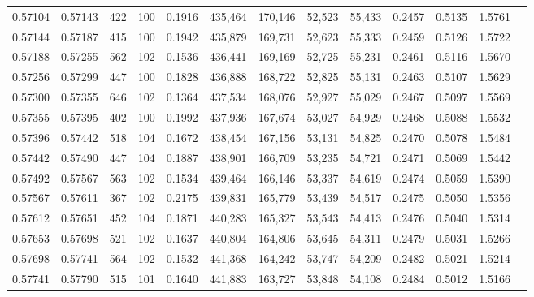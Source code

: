 \begin{tabular}{rrrrrrrrrrrrr}
0.57104 & 0.57143 &   422 & 100 &                                     0.1916 & 435,464 & 170,146 &  52,523 &  55,433 & 0.2457 & 0.5135 & 1.5761 \\
0.57144 & 0.57187 &   415 & 100 &                                     0.1942 & 435,879 & 169,731 &  52,623 &  55,333 & 0.2459 & 0.5126 & 1.5722 \\
0.57188 & 0.57255 &   562 & 102 &                                     0.1536 & 436,441 & 169,169 &  52,725 &  55,231 & 0.2461 & 0.5116 & 1.5670 \\
0.57256 & 0.57299 &   447 & 100 &                                     0.1828 & 436,888 & 168,722 &  52,825 &  55,131 & 0.2463 & 0.5107 & 1.5629 \\
0.57300 & 0.57355 &   646 & 102 &                                     0.1364 & 437,534 & 168,076 &  52,927 &  55,029 & 0.2467 & 0.5097 & 1.5569 \\
0.57355 & 0.57395 &   402 & 100 &                                     0.1992 & 437,936 & 167,674 &  53,027 &  54,929 & 0.2468 & 0.5088 & 1.5532 \\
0.57396 & 0.57442 &   518 & 104 &                                     0.1672 & 438,454 & 167,156 &  53,131 &  54,825 & 0.2470 & 0.5078 & 1.5484 \\
0.57442 & 0.57490 &   447 & 104 &                                     0.1887 & 438,901 & 166,709 &  53,235 &  54,721 & 0.2471 & 0.5069 & 1.5442 \\
0.57492 & 0.57567 &   563 & 102 &                                     0.1534 & 439,464 & 166,146 &  53,337 &  54,619 & 0.2474 & 0.5059 & 1.5390 \\
0.57567 & 0.57611 &   367 & 102 &                                     0.2175 & 439,831 & 165,779 &  53,439 &  54,517 & 0.2475 & 0.5050 & 1.5356 \\
0.57612 & 0.57651 &   452 & 104 &                                     0.1871 & 440,283 & 165,327 &  53,543 &  54,413 & 0.2476 & 0.5040 & 1.5314 \\
0.57653 & 0.57698 &   521 & 102 &                                     0.1637 & 440,804 & 164,806 &  53,645 &  54,311 & 0.2479 & 0.5031 & 1.5266 \\
0.57698 & 0.57741 &   564 & 102 &                                     0.1532 & 441,368 & 164,242 &  53,747 &  54,209 & 0.2482 & 0.5021 & 1.5214 \\
0.57741 & 0.57790 &   515 & 101 &                                     0.1640 & 441,883 & 163,727 &  53,848 &  54,108 & 0.2484 & 0.5012 & 1.5166 \\

\end{tabular}

